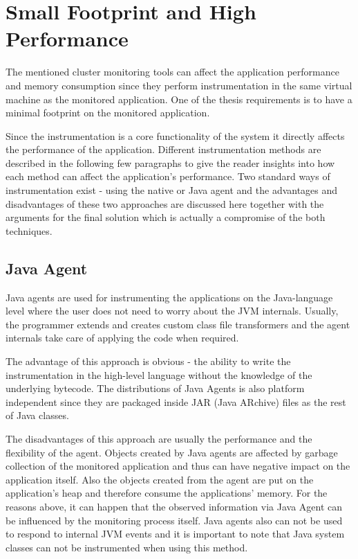 \section{Small Footprint and High Performance}
The mentioned cluster monitoring tools can affect the application performance and memory consumption since they perform instrumentation in the same virtual machine as the monitored application. One of the thesis requirements is to have  a minimal footprint on the monitored application.

Since the instrumentation is a core functionality of the system it directly affects the performance of the application. Different instrumentation methods are described in the following few paragraphs to give the reader insights into how each method can affect the application's performance. Two standard ways of instrumentation exist - using the native or Java agent and the advantages and disadvantages of these two approaches are discussed here together with the arguments for the final solution which is actually a compromise of the both techniques.
\subsection{Java Agent}
\label{java_agent}
Java agents are used for instrumenting the applications on the Java-language level where the user does not need to worry about the JVM internals. Usually, the programmer extends and creates custom class file transformers and the agent internals take care of applying the code when required. 

The advantage of this approach is obvious - the ability to write the instrumentation in the high-level language without the knowledge of the underlying bytecode. The distributions of Java Agents is also platform independent since they are packaged inside JAR (Java ARchive) files as the rest of Java classes. 

The disadvantages of this approach are usually the performance and the flexibility of the agent. Objects created by Java agents are affected by garbage collection of the monitored application and thus can have negative impact on the application itself. Also the objects created from the agent are put on the application's heap and therefore consume the applications' memory. For the reasons above, it can happen that the observed information via Java Agent can be influenced by the monitoring process itself. Java agents also can not be used to respond to internal JVM events and it is important to note that Java system classes can not be instrumented when using this method.
